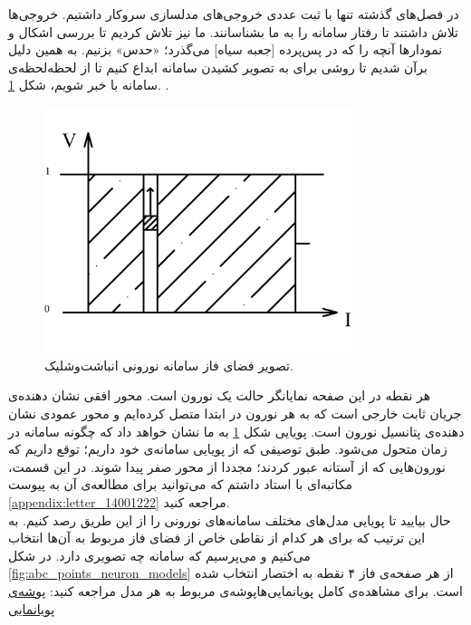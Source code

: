 	\label{chap:animations}
در فصل‌های گذشته تنها با ثبت عددی خروجی‌های مدلسازی سروکار داشتیم. خروجی‌ها تلاش داشتند تا رفتار سامانه را به ما بشناسانند. ما نیز تلاش کردیم تا بررسی اشکال و نمودارها آنچه را که در پس‌پرده [جعبه سیاه] می‌گذرد؛ «حدس» بزنیم. به همین دلیل برآن شدیم تا روشی برای به تصویر کشیدن سامانه ابداع کنیم تا از لحظه‌لحظه‌ی سامانه با خبر شویم، شکل \ref{fig:if_animation_plot}.
.
\begin{figure}[!h]
	\centering
	\includegraphics[width =0.8\textwidth]{../papers_studies/figs/IF/IF_phase_space-Model.png}
	\caption{تصویر فضای فاز سامانه نورونی انباشت‌وشلیک.}
	\label{fig:if_animation_plot}
\end{figure}

هر نقطه در این صفحه نمایانگر حالت یک نورون است. محور افقی نشان دهنده‌ی جریان ثابت خارجی است که به هر نورون در ابتدا متصل کرده‌ایم و محور عمودی نشان دهنده‌ی پتانسیل نورون است. پویایی شکل \ref{fig:if_animation_plot} به ما نشان خواهد داد که چگونه سامانه در زمان متحول می‌شود. طبق توصیفی که از پویایی سامانه‌ی خود داریم؛ توقع داریم که نورون‌هایی که از آستانه عبور کردند؛ مجددا از محور صفر پیدا شوند. در این قسمت، مکاتبه‌ای با استاد داشتم که می‌توانید برای مطالعه‌ی آن به پیوست 
\ref{appendix:letter_14001222}
مراجعه کنید.\\
حال بیایید تا پویایی مدل‌های مختلف سامانه‌های نورونی را از این طریق رصد کنیم. به این ترتیب که برای هر کدام از نقاطی خاص از فضای فاز مربوط به آن‌ها انتخاب می‌کنیم و می‌پرسیم که سامانه چه تصویری دارد. در شکل‌ 
\ref{fig:abc_points_neuron_models}
از هر صفحه‌ی فاز ۴ نقطه به اختصار انتخاب شده است. برای مشاهده‌ی کامل پویانمایی‌هاپوشه‌ی مربوط به هر مدل مراجعه کنید:
\href{https://drive.google.com/drive/folders/1iVuTAHkgfAb0rMtq1JORQ8NchS0IOrS2?usp=sharing}{پوشه‌ی پویانمایی}

